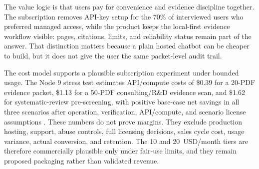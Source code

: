 The value logic is that users pay for convenience and evidence discipline together. The subscription removes API-key setup for the 70\% of interviewed users who preferred managed access, while the product keeps the local-first evidence workflow visible: pages, citations, limits, and reliability status remain part of the answer. That distinction matters because a plain hosted chatbot can be cheaper to build, but it does not give the user the same packet-level audit trail.

The cost model supports a plausible subscription experiment under bounded usage. The Node 9 stress test estimates API/compute costs of \$0.39 for a 20-PDF evidence packet, \$1.13 for a 50-PDF consulting/R\&D evidence scan, and \$1.62 for systematic-review pre-screening, with positive base-case net savings in all three scenarios after operation, verification, API/compute, and scenario license assumptions \citep{paperMemoryCostBenefit}. These numbers do not prove margins. They exclude production hosting, support, abuse controls, full licensing decisions, sales cycle cost, usage variance, actual conversion, and retention. The 10 and 20~USD/month tiers are therefore commercially plausible only under fair-use limits, and they remain proposed packaging rather than validated revenue.
